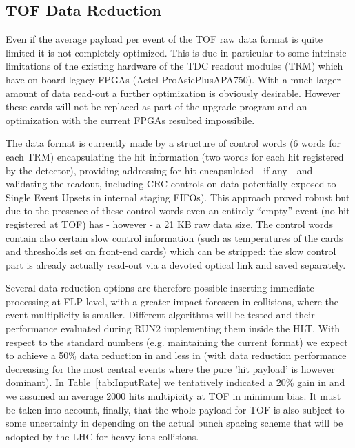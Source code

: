 \subsection{TOF Data Reduction}
\label{sec:TOFDataReduction}
Even if the average payload per event of the TOF raw data format is quite limited it is not
completely optimized. This is due in particular to some intrinsic limitations of the existing hardware
of the TDC readout modules (TRM) which have on board legacy FPGAs (Actel ProAsicPlus\circledR APA750). 
With a much larger amount of data read-out a further optimization is obviously desirable.
However these cards will not be replaced as part of the upgrade program and an optimization with the current FPGAs
resulted impossibile.

The data format is currently made by a structure of control words (6 words for each TRM) encapsulating the hit
information (two words for each hit registered by the detector), providing addressing for hit encapsulated - if any - 
and validating the readout, including CRC controls on data potentially exposed to Single Event Upsets in internal staging FIFOs). 
This approach proved robust but due to the presence of these control words even an entirely ``empty'' event 
(no hit registered at TOF) has - however - a 21 KB raw data size. The control words contain also certain slow control information 
(such as temperatures of the cards and thresholds set on front-end cards) which can be stripped: the slow control part is already 
actually read-out via a devoted optical link and saved separately.

Several data reduction options are therefore possible inserting immediate processing at FLP level, with a greater
impact foreseen in \pp collisions, where the event multiplicity is smaller.
Different algorithms will be tested and their performance evaluated during RUN2 implementing them
inside the HLT. With respect to the standard numbers (e.g. maintaining the current format) 
we expect to achieve a 50\% data reduction in \pp and less in \pbpb (with data reduction performance
decreasing for the most central events where the pure 'hit payload' is however dominant). In Table~\ref{tab:InputRate} we tentatively
indicated a 20\% gain in \pbpb and we assumed an average 2000 hits multipicity at TOF in minimum bias. It must be taken into
account, finally, that the whole payload for TOF is also subject to some uncertainty in \pbpb depending on the actual bunch spacing scheme
that will be adopted by the LHC for heavy ions collisions.
